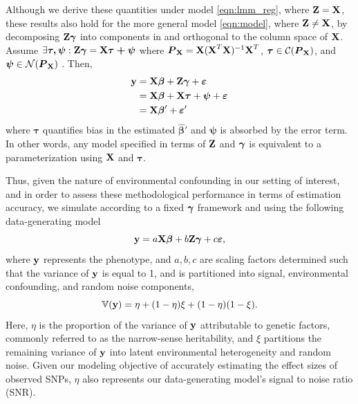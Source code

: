 Although we derive these quantities under model \eqref{eqn:lmm_reg}, where $\textbf{Z} = \textbf{X}$, these results also hold for the more general model \eqref{eqn:model}, where $\textbf{Z} \ne \textbf{X}$, by decomposing $\textbf{Z} \boldsymbol{\gamma}$ into components in and orthogonal to the column space of $\textbf{X}$. Assume  $\exists \boldsymbol{\tau, \psi}: \textbf{Z} \boldsymbol{\gamma} = \textbf{X} \boldsymbol{\tau + \psi}$ where $\boldsymbol{P}_{\textbf{X}} = \textbf{X} (\textbf{X}^T \textbf{X})^{-1} \textbf{X}^T$, $\boldsymbol{\tau} \in \mathcal{C}(\boldsymbol{P}_{\textbf{X}})$, and $\boldsymbol{\psi} \in \mathcal{N}(\boldsymbol{P}_{\textbf{X}})$ . Then,
\begin{align*}
    \textbf{y} &= \textbf{X}\boldsymbol{\beta} + \textbf{Z}\boldsymbol{\gamma} + \boldsymbol{\varepsilon}\\
    &= \textbf{X}\boldsymbol{\beta} + \textbf{X} \boldsymbol{\tau} + \boldsymbol{\psi} + \boldsymbol{\varepsilon}\\
    &=  \textbf{X} \boldsymbol{\beta}' + \boldsymbol{\varepsilon}'
\end{align*}
where $\boldsymbol{\tau}$ quantifies bias in the estimated $\boldsymbol{\hat{\beta}'}$ and $\boldsymbol{\psi}$ is absorbed by the error term. In other words, any model specified in terms of $\textbf{Z}$ and $\boldsymbol{\gamma}$ is equivalent to a parameterization using $\textbf{X}$ and $\boldsymbol{\tau}$.

 Thus, given the nature of environmental confounding in our setting of interest, and in order to assess these methodological performance in terms of estimation accuracy, we simulate according to a fixed $\boldsymbol{\gamma}$ framework and using the following data-generating model
\begin{equation}
    \label{eqn:sim}
    \textbf{y} = a \textbf{X} \boldsymbol{\beta} + b \textbf{Z} \boldsymbol{\gamma} + c \boldsymbol{\varepsilon},
\end{equation}
where $\textbf{y}$ represents the phenotype, and $a, b, c$ are scaling factors determined such that the variance of $\textbf{y}$ is equal to 1, and is partitioned into signal, environmental confounding, and random noise components,
\begin{equation}
    \label{eqn:parition_y}
    \mathbb{V}(\textbf{y}) = \eta + (1 - \eta) \xi + (1-\eta)(1-\xi).
\end{equation}
Here, $\eta$ is the proportion of the variance of $\textbf{y}$ attributable to genetic factors, commonly referred to as the narrow-sense heritability, and $\xi$ partitions the remaining variance of $\textbf{y}$ into latent environmental heterogeneity and random noise.  Given our modeling objective of accurately estimating the effect sizes of observed SNPs, $\eta$ also represents our data-generating model's signal to noise ratio (SNR). 

